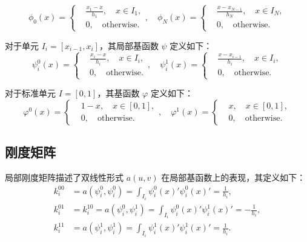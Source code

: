 \documentclass[11pt]{ctexart}
\begin{document}
\begin{equation}
  \phi_0(x) = \left\{
       \begin{aligned}
            & \frac{x_1-x}{h_1}, \quad x \in I_1, \\
            & 0, \quad \text{otherwise}.
        \end{aligned}
      \right.,\quad 
  \phi_N(x) = \left\{
        \begin{aligned}
             & \frac{x-x_{N-1}}{h_N}, \quad x \in I_N, \\
             & 0, \quad \text{otherwise}.
         \end{aligned}
         \right.
\end{equation}

对于单元 $ I_i = [x_{i-1},x_i] $，其局部基函数 $ \psi $ 定义如下：
\begin{equation}
  \psi^0_i(x) = \left\{
       \begin{aligned}
            &\frac{x_i-x}{h_i}, \quad x \in I_{i}, \\
            &0, \quad \text{otherwise}.
       \end{aligned}
  \right.,\quad
  \psi^1_i(x) = \left\{
       \begin{aligned}
            &\frac{x-x_{i-1}}{h_i}, \quad x \in I_{i}, \\
            &0, \quad \text{otherwise}.
       \end{aligned}
  \right.
\end{equation}

对于标准单元 $ I = [0,1] $，其基函数 $ {\varphi} $ 定义如下：
\begin{equation}
  {\varphi}^0(x) = \left\{
       \begin{aligned}
            &1-x, \quad x \in [0,1], \\
            &0, \quad \text{otherwise}.
       \end{aligned}
  \right.,\quad
  {\varphi}^1(x) = \left\{
       \begin{aligned}
            &x, \quad x \in [0,1], \\
            &0, \quad \text{otherwise}.
       \end{aligned}
  \right.
\end{equation}

\subsection{刚度矩阵}
局部刚度矩阵描述了双线性形式 $ a(u,v) $ 在局部基函数上的表现，其定义如下：
\begin{equation}
  \begin{aligned}
       k_{i}^{00}&= a(\psi_i^0,\psi_i^0) = \int_{I_i} \psi_i^0(x)' \psi_i^0(x)' = \frac{1}{h_i}, \\
       k_{i}^{01}&= k_{i}^{10}= a(\psi_i^0,\psi_i^1) = \int_{I_i} \psi_i^0(x)' \psi_i^1(x)' = -\frac{1}{h_i}, \\
       k_{i}^{11}&= a(\psi_i^1,\psi_i^1) = \int_{I_i} \psi_i^1(x)' \psi_i^1(x)' = \frac{1}{h_i}.
  \end{aligned}
\end{equation}
\end{document}
